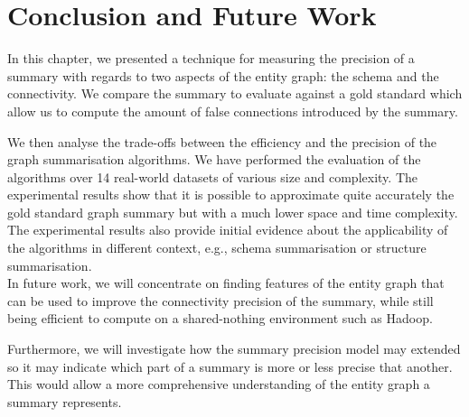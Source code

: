 \section{Conclusion and Future Work}

In this chapter, we presented a technique for measuring the precision of a summary with regards to two aspects of the entity graph: the schema and the connectivity. We compare the summary to evaluate against a gold standard which allow us to compute the amount of false connections introduced by the summary.

We then analyse the trade-offs between the efficiency and the precision of the graph summarisation algorithms. We have performed the evaluation of the algorithms over 14 real-world datasets of various size and complexity. The experimental results show that it is possible to approximate quite accurately the gold standard graph summary but with a much lower space and time complexity. The experimental results also provide initial evidence about the applicability of the algorithms in different context, e.g., schema summarisation or structure summarisation.\\

In future work, we will concentrate on finding features of the entity graph that can be used to improve the connectivity precision of the summary, while still being efficient to compute on a shared-nothing environment such as Hadoop.

Furthermore, we will investigate how the summary precision model may extended so it may indicate which part of a summary is more or less precise that another. This would allow a more comprehensive understanding of the entity graph a summary represents.
